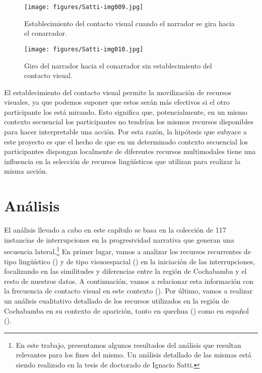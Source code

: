 \documentclass[output=paper]{../langscibook}
\begin{document}
\begin{figure}
\texttt{[image: figures/Satti-img009.jpg]}
\caption{\label{fig:satti:9}Establecimiento del contacto visual cuando el narrador se gira hacia el conarrador.}
\end{figure}

\begin{figure}
\texttt{[image: figures/Satti-img010.jpg]}
\caption{\label{fig:satti:10}Giro del narrador hacia el conarrador sin establecimiento del contacto visual.}
\end{figure}

El establecimiento del contacto visual permite la movilización de recursos visuales, ya que podemos suponer que estos serán más efectivos si el otro participante los está mirando. Esto significa que, potencialmente, en un mismo contexto secuencial los participantes no tendrían los mismos recursos disponibles para hacer interpretable una acción. Por esta razón, la hipótesis que subyace a este proyecto es que el hecho de que en un determinado contexto secuencial los participantes dispongan localmente de diferentes recursos multimodales tiene una influencia en la selección de recursos lingüísticos que utilizan para realizar la misma acción.

\section{Análisis}

El análisis llevado a cabo en este capítulo se basa en la colección de 117 instancias de interrupciones en la progresividad narrativa que generan una secuencia lateral.\footnote{En este trabajo, presentamos algunos resultados del análisis que resultan relevantes para los fines del mismo. Un análisis detallado de las mismas está siendo realizado en la tesis de doctorado de Ignacio Satti.} En primer lugar, vamos a analizar los recursos recurrentes de tipo lingüístico () y de tipo visuoespacial () en la iniciación de las interrupciones, focalizando en las similitudes y diferencias entre la región de Cochabamba y el resto de nuestros datos. A continuación, vamos a relacionar esta información con la frecuencia de contacto visual en este contexto (). Por último, vamos a realizar un análisis cualitativo detallado de los recursos utilizados en la región de Cochabamba en su contexto de aparición, tanto en quechua () como en español ().
\end{document}
